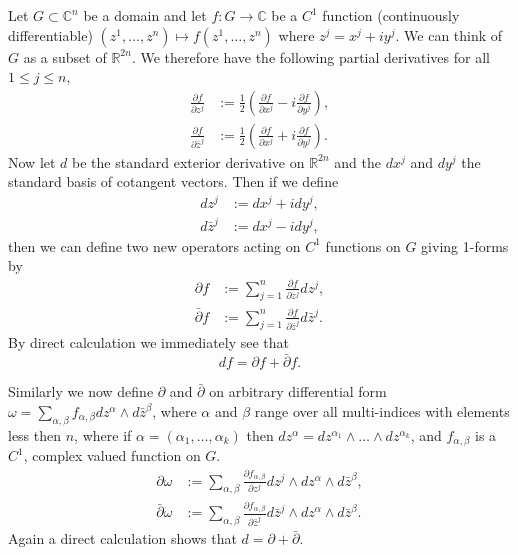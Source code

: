 \documentclass[12pt]{article}
\theoremstyle{theorem}
\theoremstyle{definition}
\theoremstyle{remark}
\begin{document}
Let $G \subset {\mathbb{C}}^n$ be a domain and let
$f \colon G \to {\mathbb{C}}$ be a $C^1$
function (continuously differentiable)
$(z^1,\ldots,z^n) \mapsto f(z^1,\ldots,z^n)$ where $z^j = x^j + i y^j$.
We can think of $G$ as a subset of ${\mathbb{R}}^{2n}$.
We therefore
have the following partial derivatives for all $1 \leq j \leq n$,
\begin{align*}
\frac{\partial f}{\partial z^j} & :=
\frac{1}{2} \left(
\frac{\partial f}{\partial x^j} - i \frac{\partial f}{\partial y^j}
\right) ,
\\
\frac{\partial f}{\partial \bar{z}^j} & :=
\frac{1}{2} \left(
\frac{\partial f}{\partial x^j} + i \frac{\partial f}{\partial y^j}
\right) .
\end{align*}
Now let $d$ be the standard exterior derivative on
${\mathbb{R}}^{2n}$ and the $dx^j$ and $dy^j$ the standard basis of cotangent
vectors.  Then if we define
\begin{align*}
dz^j & := dx^j + i dy^j , \\
d\bar{z}^j & := dx^j - i dy^j ,
\end{align*}
then we can define two new operators acting on $C^1$ functions on $G$
giving 1-forms by
\begin{align*}
\partial f & := \sum_{j=1}^n \frac{\partial f}{\partial z^j} dz^j , \\
\bar{\partial} f & := \sum_{j=1}^n \frac{\partial f}{\partial \bar{z}^j}
d\bar{z}^j .
\end{align*}
By direct calculation we immediately see that
\begin{equation*}
df = \partial f + \bar{\partial} f .
\end{equation*}

Similarly we now define $\partial$ and $\bar{\partial}$
on arbitrary differential form
$\omega = \sum_{\alpha,\beta} f_{\alpha,\beta} dz^\alpha \wedge
d\bar{z}^\beta$, where $\alpha$ and $\beta$ range over all multi-indices with
elements less then $n$, where if $\alpha = (\alpha_1,\ldots,\alpha_k)$
then $dz^\alpha = dz^{\alpha_1} \wedge \ldots \wedge dz^{\alpha_k}$,
and $f_{\alpha,\beta}$ is a $C^1$, complex valued function
on $G$.
\begin{align*}
\partial \omega
& :=
\sum_{\alpha,\beta} \frac{\partial f_{\alpha,\beta}}{\partial z^j} dz^j
\wedge
dz^\alpha \wedge d\bar{z}^\beta
, \\
\bar{\partial} \omega
& :=
\sum_{\alpha,\beta} \frac{\partial f_{\alpha,\beta}}{\partial \bar{z}^j}
d\bar{z}^j
\wedge
dz^\alpha \wedge d\bar{z}^\beta .
\end{align*}
Again a direct calculation shows that $d = \partial + \bar{\partial}$.
\end{document}
